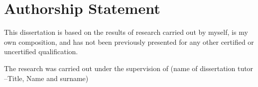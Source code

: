 \newpage

\chapter*{\centering Authorship Statement}
\vspace{-0.2in}

\begin{spacing}{1.5}
\setlength{\parskip}{0.3in}
\setlength{\parindent}{0in}


This dissertation is based on the results of research carried out by myself, is my
own composition, and has not been previously presented for any other certified
or uncertified qualification.

The research was carried out under the supervision of (name of dissertation tutor
–Title, Name and surname)

\vspace{2.5cm}

\begin{center}
	\makebox[4cm]{\dotfill}  \hfill \makebox[4cm]{\dotfill}\\
	      \hfill {}
\end{center}
\end{spacing}
\newpage
